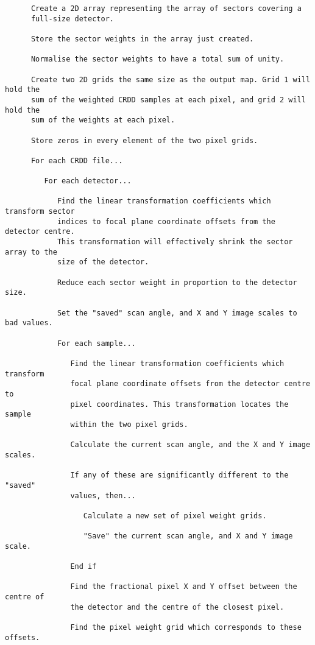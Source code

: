 \begin{verbatim}
      Create a 2D array representing the array of sectors covering a 
      full-size detector.

      Store the sector weights in the array just created.

      Normalise the sector weights to have a total sum of unity.

      Create two 2D grids the same size as the output map. Grid 1 will hold the 
      sum of the weighted CRDD samples at each pixel, and grid 2 will hold the
      sum of the weights at each pixel.

      Store zeros in every element of the two pixel grids.

      For each CRDD file...

         For each detector...

            Find the linear transformation coefficients which transform sector 
            indices to focal plane coordinate offsets from the detector centre. 
            This transformation will effectively shrink the sector array to the 
            size of the detector.

            Reduce each sector weight in proportion to the detector size.

            Set the "saved" scan angle, and X and Y image scales to bad values.

            For each sample...
      
               Find the linear transformation coefficients which transform 
               focal plane coordinate offsets from the detector centre to 
               pixel coordinates. This transformation locates the sample 
               within the two pixel grids.

               Calculate the current scan angle, and the X and Y image scales.

               If any of these are significantly different to the "saved" 
               values, then...
                  
                  Calculate a new set of pixel weight grids.

                  "Save" the current scan angle, and X and Y image scale.

               End if

               Find the fractional pixel X and Y offset between the centre of 
               the detector and the centre of the closest pixel.

               Find the pixel weight grid which corresponds to these offsets.


\end{verbatim}
